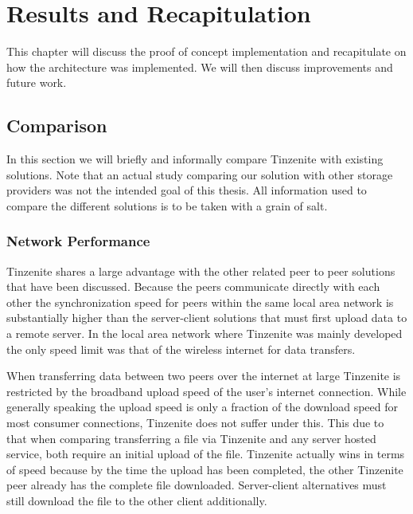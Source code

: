 \chapter{Results and Recapitulation}
\label{chap:Results and Recapitulation}

This chapter will discuss the proof of concept implementation and recapitulate on how the architecture was implemented.
We will then discuss improvements and future work.

\section{Comparison}

In this section we will briefly and informally compare Tinzenite with existing solutions.
Note that an actual study comparing our solution with other storage providers was not the intended goal of this thesis.
All information used to compare the different solutions is to be taken with a grain of salt.

\subsection{Network Performance}
\label{sub:Performance}

Tinzenite shares a large advantage with the other related peer to peer solutions that have been discussed.
Because the peers communicate directly with each other the synchronization speed for peers within the same local area network is substantially higher than the server-client solutions that must first upload data to a remote server.
In the local area network where Tinzenite was mainly developed the only speed limit was that of the wireless internet for data transfers.

When transferring data between two peers over the internet at large Tinzenite is restricted by the broadband upload speed of the user's internet connection.
While generally speaking the upload speed is only a fraction of the download speed for most consumer connections, Tinzenite does not suffer under this.
This due to that when comparing transferring a file via Tinzenite and any server hosted service, both require an initial upload of the file.
Tinzenite actually wins in terms of speed because by the time the upload has been completed, the other Tinzenite peer already has the complete file downloaded.
Server-client alternatives must still download the file to the other client additionally.

%

